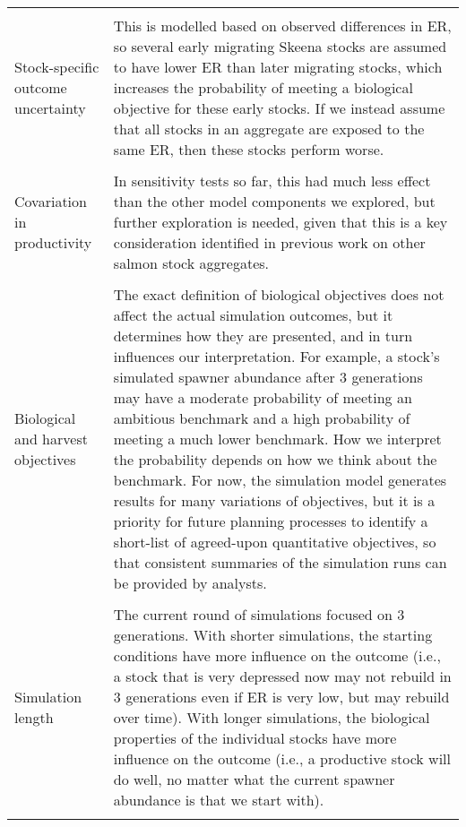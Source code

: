 \documentclass[french,11pt]{book}
\begin{document}
\begin{longtable}[t]{>{\raggedright\arraybackslash}p{7em}>{\raggedright\arraybackslash}p{43em}}
\midrule\\ Stock-specific outcome uncertainty & This is modelled based on observed differences in ER, so several early migrating Skeena stocks are assumed to have lower ER than later migrating stocks, which increases the probability of meeting a biological objective for these early stocks. If we instead assume that all stocks in an aggregate are exposed to the same ER, then these stocks perform worse.\\
\midrule\\ Covariation in productivity & In sensitivity tests so far, this had much less effect than the other model components we explored, but further exploration is needed, given that this is a key consideration identified in previous work on other salmon stock aggregates.\\
\midrule\\ Biological  and harvest objectives & The exact definition of biological objectives does not affect the actual simulation outcomes, but it determines how they are presented, and in turn influences our interpretation.  For example, a  stock's simulated spawner abundance after 3 generations may have a moderate probability of meeting an ambitious benchmark and a high probability of meeting a much lower  benchmark. How we interpret the probability depends on how we think about the benchmark. For now, the simulation model generates results for many variations of objectives, but it is a priority for future planning processes to identify a short-list of agreed-upon quantitative objectives, so that consistent summaries of the simulation runs can be provided by analysts.\\
\midrule\\ Simulation length & The current round of simulations focused on 3 generations. With shorter simulations, the starting conditions have more influence on the outcome (i.e., a stock that is very depressed now may not rebuild in 3 generations even if ER is very low, but may rebuild over time). With longer simulations, the biological properties of the individual stocks have more influence on the outcome (i.e., a productive stock will do well, no matter what the current spawner abundance is that we start with).\\* \end{longtable}

\endgroup{} \endgroup{}

\clearpage
\end{document}

